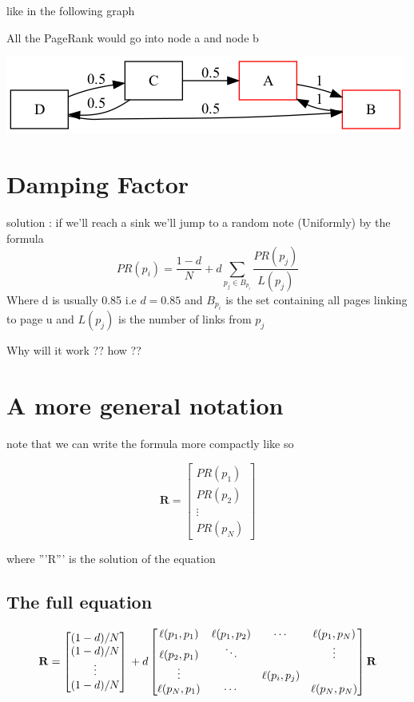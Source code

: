 \documentclass[11pt]{article}
\begin{document}
like in the following graph

All the PageRank would go into node a and node b

\begin{center}
\includegraphics[width=.9\linewidth]{inifinite_cycle.png}
\end{center}


\section*{Damping Factor}
\label{sec:org07c9da5}
solution : if we'll reach a sink we'll jump to a random note (Uniformly)
by the formula
\[ PR(p_{i})= \frac{1-d}{N} + d \sum_{p_{j} \in B_{p_i}} \frac{PR(p_j)}{L(p_j)} \]
Where d is usually 0.85 i.e \(d=0.85\) and \(B_{p_i}\) is the set containing all pages linking to page u
and \(L(p_j)\) is the number of links from \(p_j\)

Why will it work ?? how ??





\section*{A more general notation}
\label{sec:orga19cf7a}
note that we can write the formula more compactly like so

\begin{equation}
\mathbf{R} =
\begin{bmatrix}
PR(p_1) \\
PR(p_2) \\
\vdots \\
PR(p_N)
\end{bmatrix}
\end{equation}

where '''R''' is the solution of the equation
\subsection*{The full equation}
\label{sec:org5756a7d}


\begin{equation}
\mathbf{R} =
\begin{bmatrix}
{(1-d)/ N} \\
{(1-d) / N} \\
\vdots \\
{(1-d) / N}
\end{bmatrix}
\\ + d
\begin{bmatrix}
\ell(p_1,p_1) & \ell(p_1,p_2) & \cdots & \ell(p_1,p_N) \\
\ell(p_2,p_1) & \ddots &  & \vdots \\
\vdots & & \ell(p_i,p_j) & \\
\ell(p_N,p_1) & \cdots & & \ell(p_N,p_N)
\end{bmatrix}
\mathbf{R}
\end{equation}
\end{document}
